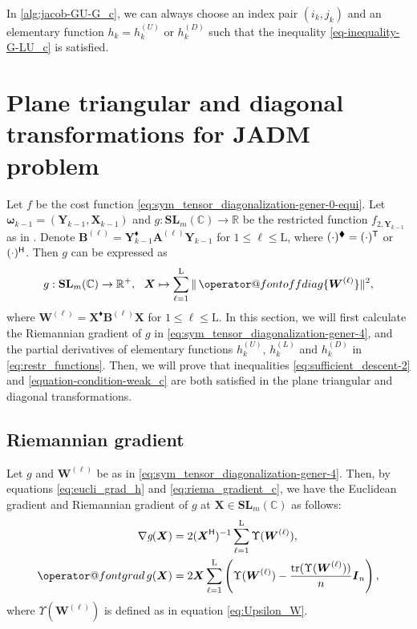 \documentclass[final,onefignum,onetabnum]{siamart190516}
\makeatletter
\newcommand{\matr}[1]{\boldsymbol{#1}}
\newcommand{\T}{{\sf T}} %
\renewcommand{\H}{{\sf H}} %
\newcommand{\offdiag}[1]{\mathop{\operator@font offdiag}\{#1\}} %
\newcommand{\ProjGrad}[2]{\mathop{{\operator@font grad} }#1(#2)}
\newcommand{\RR}{\mathbb{R}}
\newcommand{\CC}{\mathbb{C}}
\newcommand{\matrelem}[1]{\mathrm{#1}}
\renewcommand{\H}{{\sf H}}      %
\renewcommand{\TH}{{\blacklozenge}}
\newcommand{\SL}{\mathbf{SL}}
\newcommand{\tr}{\mbox{tr}}
\makeatother
\begin{document}
\begin{proposition}\label{theorem-wellness-Jacobi-G-GU_c}
In \autoref{alg:jacob-GU-G_c},
we can always choose an index pair $(i_k,j_k)$ and an elementary function $h_k=h^{(U)}_k$ or $h^{(D)}_k$ such that the inequality \cref{eq-inequality-G-LU_c} is satisfied. 
\end{proposition}

\section{Plane triangular and diagonal transformations for JADM problem}\label{sec:trian_diago_rotation}

Let $f$ be the cost function \cref{eq:sym_tensor_diagonalization-gener-0-equi}. 
Let $\matr{\omega}_{k-1}=(\matr{Y}_{k-1},\matr{X}_{k-1})$ and $g: \SL_{m}(\CC)\rightarrow\RR$ be the restricted function $f_{2,\matr{Y}_{k-1}}$ as in . 
Denote $\matr{B}^{(\ell)}=\matr{Y}_{k-1}^{\TH}\matr{A}^{(\ell)} \matr{Y}_{k-1}$ for $1\leq\ell\leq \matrelem{L}$, where $(\cdot)^{\TH}=(\cdot)^{\T}$ or $(\cdot)^{\H}$. 
Then $g$ can be expressed as 
\begin{equation}\label{eq:sym_tensor_diagonalization-gener-4}
g: \SL_{m}(\CC)\rightarrow\RR^+,\ \ \matr{X}\mapsto \sum_{\ell=1}^{\matrelem{L}} \|\offdiag{\matr{W}^{(\ell)}}\|^2,
\end{equation}
where 
$\matr{W}^{(\ell)}=\matr{X}^{\TH}\matr{B}^{(\ell)} \matr{X}$ for $1\leq\ell\leq \matrelem{L}$. 
In this section, we will first calculate the Riemannian gradient of $g$ in \cref{eq:sym_tensor_diagonalization-gener-4}, and the partial derivatives of elementary functions $h^{(U)}_k$, $h^{(L)}_k$ and $h^{(D)}_k$ in \cref{eq:restr_functions}. 
Then, we will prove that inequalities \cref{eq:sufficient_descent-2} and \cref{equation-condition-weak_c} are both satisfied in the plane triangular and diagonal transformations.

\subsection{Riemannian gradient}

Let $g$ and $\matr{W}^{(\ell)}$ be as in  \cref{eq:sym_tensor_diagonalization-gener-4}.  
Then, by equations \cref{eq:eucli_grad_h} and \cref{eq:riema_gradient_c}, 
we have the Euclidean gradient and Riemannian gradient of $g$ at $\matr{X}\in\SL_{m}(\CC)$ as follows: 
\begin{align}
\nabla\textit{g}(\matr{X})  & = 2(\matr{X}^{\H})^{-1}\sum_{\ell=1}^{\matrelem{L}}\Upsilon(\matr{W}^{(\ell)}),\label{eq:euclidean_grad}\\
\ProjGrad{g}{\matr{X}} & = 2\matr{X}\sum_{\ell=1}^{\matrelem{L}}\left(\Upsilon(\matr{W}^{(\ell)}) - \frac{\tr(\Upsilon(\matr{W}^{(\ell)}))}{n}\matr{I}_{n}\right),\label{eq:rrieman_grad}
\end{align}
where $\Upsilon(\matr{W}^{(\ell)})$ is defined as in equation \cref{eq:Upsilon_W}. 
\end{document}
